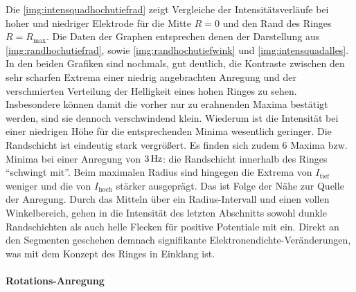 \documentclass[numbers=noenddot,a4paper]{scrartcl}
\newcommand{\ix}[1]{_\text{#1}}
\begin{document}
					Die \ref{img:intensquadhochutiefrad} zeigt Vergleiche der Intensitätsverläufe bei hoher und niedriger Elektrode für die Mitte $R=0$ und den Rand des Ringes $R=R\ix{max}$. Die Daten der Graphen entsprechen denen der Darstellung aus \ref{img:randhochutiefrad}, sowie \ref{img:randhochutiefwink} und \ref{img:intensquadalles}. In den beiden Grafiken sind nochmals, gut deutlich, die Kontraste zwischen den sehr scharfen Extrema einer niedrig angebrachten Anregung und der verschmierten Verteilung der Helligkeit eines hohen Ringes zu sehen. Insbesondere können damit die vorher nur zu erahnenden Maxima bestätigt werden, sind sie dennoch verschwindend klein. Wiederum ist die Intensität bei einer niedrigen Höhe für die entsprechenden Minima wesentlich geringer. Die Randschicht ist eindeutig stark vergrößert. Es finden sich zudem 6 Maxima bzw. Minima bei einer Anregung von $\unit[3]{Hz}$: die Randschicht innerhalb des Ringes "`schwingt mit"'. Beim maximalen Radius sind hingegen die Extrema von $I\ix{tief}$ weniger und die von $I\ix{hoch}$ stärker ausgeprägt. Das ist Folge der Nähe zur Quelle der Anregung. Durch das Mitteln über ein Radius-Intervall und einen vollen Winkelbereich, gehen in die Intensität des letzten Abschnitts sowohl dunkle Randschichten als auch helle Flecken für positive Potentiale mit ein. Direkt an den Segmenten geschehen demnach signifikante Elektronendichte-Veränderungen, was mit dem Konzept des Ringes in Einklang ist.\\

				\paragraph{Rotations-Anregung}
\end{document}
